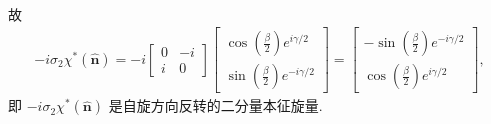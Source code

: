 \documentclass{assignment}
\begin{document}
\begin{pf}
\begin{itemize}
\begin{align}
        \end{align}
        故
        \begin{align}
            -i\sigma_2\chi^*(\hat{\bm{n}})=-i\begin{bmatrix}
                0&-i\\
                i&0
            \end{bmatrix}\begin{bmatrix}
                \cos\left(\frac{\beta}{2}\right)e^{i\gamma/2}\\
                \sin\left(\frac{\beta}{2}\right)e^{-i\gamma/2}
            \end{bmatrix}=\begin{bmatrix}
                -\sin\left(\frac{\beta}{2}\right)e^{-i\gamma/2}\\
                \cos\left(\frac{\beta}{2}\right)e^{i\gamma/2}
            \end{bmatrix},
        \end{align}
        即 $-i\sigma_2\chi^*(\hat{\bm{n}})$ 是自旋方向反转的二分量本征旋量.
    \end{itemize}
\end{pf}
\end{document}
